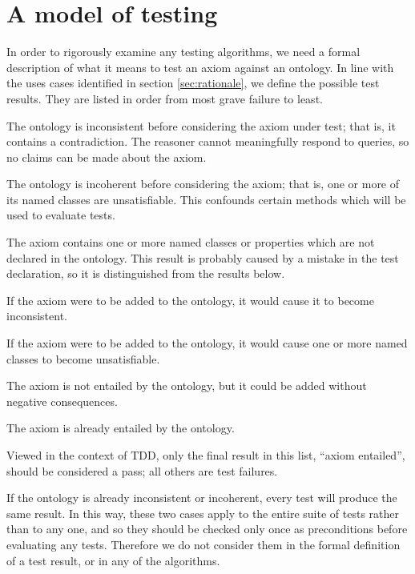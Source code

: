 \documentclass[paper.tex]{subfiles}
\begin{document}
\section{A model of testing}
\label{sec:model}

In order to rigorously examine any testing algorithms, we need a formal description of what it means to test an axiom against an ontology.
In line with the uses cases identified in section \ref{sec:rationale}, we define the possible test results.
They are listed in order from most grave failure to least.
\begin{description}[
  before={\renewcommand\makelabel[1]{\normalfont\itshape##1:}},
  labelindent=1em,
  leftmargin=2em,
  nosep,
]
  \item[Ontology already inconsistent]  The ontology is inconsistent before considering the axiom under test; that is, it contains a contradiction.  The reasoner cannot meaningfully respond to queries, so no claims can be made about the axiom.
  \item[Ontology already incoherent]  The ontology is incoherent before considering the axiom; that is, one or more of its named classes are unsatisfiable.  This confounds certain methods which will be used to evaluate tests.
  \item[Missing entity in axiom]  The axiom contains one or more named classes or properties which are not declared in the ontology.  This result is probably caused by a mistake in the test declaration, so it is distinguished from the results below.
  \item[Axiom causes inconsistency]  If the axiom were to be add\-ed to the ontology, it would cause it to become inconsistent.
  \item[Axiom causes incoherence]  If the axiom were to be added to the ontology, it would cause one or more named classes to become unsatisfiable.
  \item[Axiom absent]  The axiom is not entailed by the ontology, but it could be added without negative consequences.
  \item[Axiom entailed]  The axiom is already entailed by the ontology.
\end{description}

Viewed in the context of TDD, only the final result in this list, ``axiom entailed'', should be considered a pass; all others are test failures.

If the ontology is already inconsistent or incoherent, every test will produce the same result.  In this way, these two cases apply to the entire suite of tests rather than to any one, and so they should be checked only once as preconditions before evaluating any tests.  Therefore we do not consider them in the formal definition of a test result, or in any of the algorithms.
\end{document}

